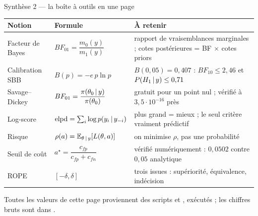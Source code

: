 \begin{frame}{Synthèse 2 --- la boîte à outils en une page}
\begin{center}
\small
\begin{tabular}{@{}p{3.2cm}p{4.0cm}p{5.8cm}@{}}
\toprule
\textbf{Notion} & \textbf{Formule} & \textbf{À retenir} \\
\midrule
Facteur de Bayes & $BF_{01} = \dfrac{m_0(y)}{m_1(y)}$ &
rapport de vraisemblances marginales ; cotes postérieures = BF $\times$ cotes priors \\[1.4mm]
Calibration SBB & $B(p) = -e\,p\ln p$ &
$B(0{,}05) = 0{,}407$ : $BF_{10} \le 2{,}46$ et $P(H_1 \,\vert\, y) \le 0{,}71$ \\[1.4mm]
Savage--Dickey & $BF_{01} = \dfrac{\pi(\theta_0 \,\vert\, y)}{\pi(\theta_0)}$ &
gratuit pour un point nul ; vérifié à $3{,}5\cdot10^{-16}$ près \\[1.4mm]
Log-score & $\text{elpd} = \sum_i \log p(y_i \,\vert\, y_{-i})$ &
plus grand = mieux ; le seul critère vraiment prédictif \\[1.4mm]
Risque & $\rho(a) = \mathbb{E}_{\theta \,\vert\, y}[L(\theta,a)]$ &
on minimise $\rho$, pas une probabilité \\[1.4mm]
Seuil de coût & $a^\star = \dfrac{c_{fp}}{c_{fp}+c_{fn}}$ &
vérifié numériquement : $0{,}0502$ contre $0{,}05$ analytique \\[1.4mm]
ROPE & $[-\delta, \delta]$ &
trois issues : supériorité, équivalence, indécision \\
\bottomrule
\end{tabular}
\end{center}
\vspace{1mm}
\centering\footnotesize
Toutes les valeurs de cette page proviennent des scripts
 et , exécutés ;
les chiffres bruts sont dans .
\end{frame}

